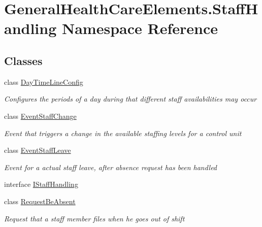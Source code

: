 \hypertarget{namespace_general_health_care_elements_1_1_staff_handling}{}\section{General\+Health\+Care\+Elements.\+Staff\+Handling Namespace Reference}
\label{namespace_general_health_care_elements_1_1_staff_handling}
\subsection*{Classes}
\begin{DoxyCompactItemize}
\item 
class \hyperlink{class_general_health_care_elements_1_1_staff_handling_1_1_day_time_line_config}{Day\+Time\+Line\+Config}
\begin{DoxyCompactList}\small\item\em Configures the periods of a day during that different staff availabilities may occur \end{DoxyCompactList}\item 
class \hyperlink{class_general_health_care_elements_1_1_staff_handling_1_1_event_staff_change}{Event\+Staff\+Change}
\begin{DoxyCompactList}\small\item\em Event that triggers a change in the available staffing levels for a control unit \end{DoxyCompactList}\item 
class \hyperlink{class_general_health_care_elements_1_1_staff_handling_1_1_event_staff_leave}{Event\+Staff\+Leave}
\begin{DoxyCompactList}\small\item\em Event for a actual staff leave, after absence request has been handled \end{DoxyCompactList}\item 
interface \hyperlink{interface_general_health_care_elements_1_1_staff_handling_1_1_i_staff_handling}{I\+Staff\+Handling}
\item 
class \hyperlink{class_general_health_care_elements_1_1_staff_handling_1_1_request_be_absent}{Request\+Be\+Absent}
\begin{DoxyCompactList}\small\item\em Request that a staff member files when he goes out of shift \end{DoxyCompactList}\item 

\end{DoxyCompactItemize}
